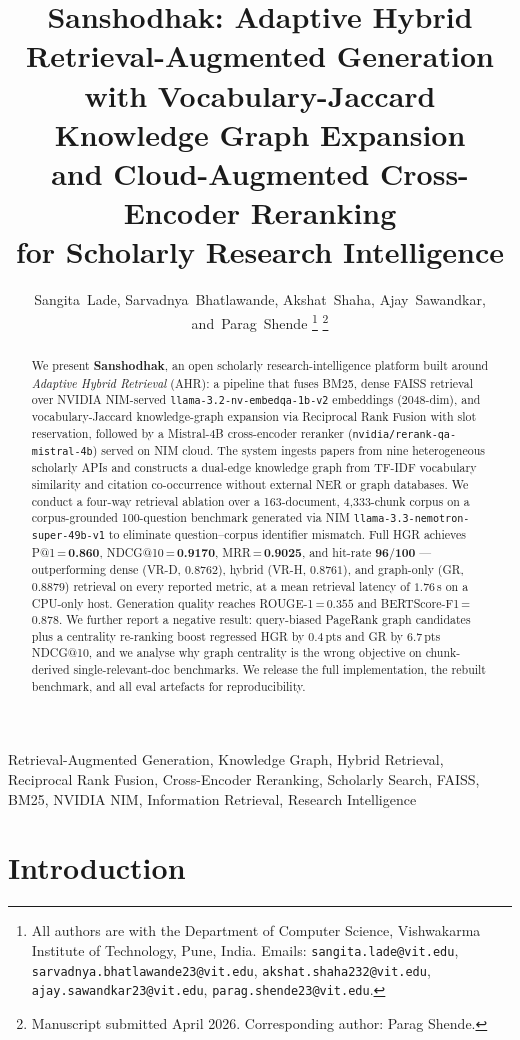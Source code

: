 \documentclass[journal]{IEEEtran}
\title{Sanshodhak: Adaptive Hybrid Retrieval-Augmented Generation\\
       with Vocabulary-Jaccard Knowledge Graph Expansion\\
       and Cloud-Augmented Cross-Encoder Reranking\\
       for Scholarly Research Intelligence}
\author{%
  Sangita~Lade,
  Sarvadnya~Bhatlawande,
  Akshat~Shaha,
  Ajay~Sawandkar,
  and~Parag~Shende%
  \thanks{All authors are with the Department of Computer Science,
          Vishwakarma Institute of Technology, Pune, India.
          Emails: \texttt{sangita.lade@vit.edu},
          \texttt{sarvadnya.bhatlawande23@vit.edu},
          \texttt{akshat.shaha232@vit.edu},
          \texttt{ajay.sawandkar23@vit.edu},
          \texttt{parag.shende23@vit.edu}.}%
  \thanks{Manuscript submitted April 2026. Corresponding author:
          Parag Shende.}}
\begin{document}
\maketitle

\begin{abstract}
We present \textbf{Sanshodhak}, an open scholarly research-intelligence
platform built around \emph{Adaptive Hybrid Retrieval} (AHR): a
pipeline that fuses BM25, dense FAISS retrieval over NVIDIA NIM-served
\texttt{llama-3.2-nv-embedqa-1b-v2} embeddings (2048-dim), and
vocabulary-Jaccard knowledge-graph expansion via Reciprocal Rank
Fusion with slot reservation, followed by a Mistral-4B cross-encoder
reranker (\texttt{nvidia/rerank-qa-mistral-4b}) served on NIM cloud.
The system ingests papers from nine heterogeneous scholarly APIs and
constructs a dual-edge knowledge graph from TF-IDF vocabulary
similarity and citation co-occurrence without external NER or graph
databases. We conduct a four-way retrieval ablation over a
163-document, 4{,}333-chunk corpus on a corpus-grounded 100-question
benchmark generated via NIM
\texttt{llama-3.3-nemotron-super-49b-v1} to eliminate
question--corpus identifier mismatch. Full HGR achieves
P@1\,=\,\textbf{0.860}, NDCG@10\,=\,\textbf{0.9170},
MRR\,=\,\textbf{0.9025}, and hit-rate $\mathbf{96/100}$ — outperforming
dense (VR-D, $0.8762$), hybrid (VR-H, $0.8761$), and graph-only (GR,
$0.8879$) retrieval on every reported metric, at a mean retrieval
latency of $1.76$\,s on a CPU-only host. Generation quality reaches
ROUGE-1\,=\,$0.355$ and BERTScore-F1\,=\,$0.878$. We further report a
negative result: query-biased PageRank graph candidates plus a
centrality re-ranking boost regressed HGR by $0.4$\,pts and GR by
$6.7$\,pts NDCG@10, and we analyse why graph centrality is the wrong
objective on chunk-derived single-relevant-doc benchmarks. We release
the full implementation, the rebuilt benchmark, and all eval
artefacts for reproducibility.
\end{abstract}

\begin{IEEEkeywords}
Retrieval-Augmented Generation, Knowledge Graph, Hybrid Retrieval,
Reciprocal Rank Fusion, Cross-Encoder Reranking, Scholarly Search,
FAISS, BM25, NVIDIA NIM, Information Retrieval, Research Intelligence
\end{IEEEkeywords}

\section{Introduction}
\label{sec:intro}
\end{document}
